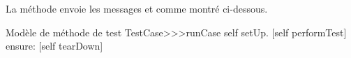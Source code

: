 \documentclass[a4paper,10pt,twoside]{book}
\begin{document}
La méthode  envoie les messages  et  comme montré ci-dessous.
\begin{method}[testcaseruncase]{Modèle de méthode de test}
TestCase>>>runCase
	self setUp.
	[self performTest] ensure: [self tearDown]
\end{method}


\end{document}
